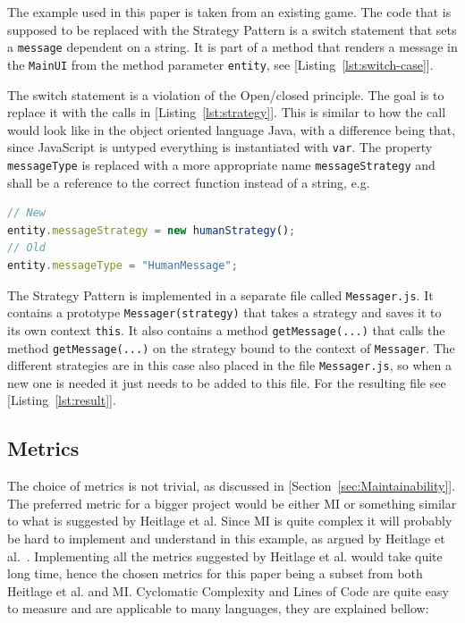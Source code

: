 \documentclass[conference, a4paper]{IEEEtran}
\begin{document}
The example used in this paper is taken from an existing game. The code that is supposed to be replaced with the Strategy Pattern is a switch statement that sets a \texttt{message} dependent on a string. It is part of a method that renders a message in the \texttt{MainUI} from the method parameter \texttt{entity}, see [Listing~\ref{lst:switch-case}].

The switch statement is a violation of the Open/closed principle. The goal is to replace it with the calls in [Listing~\ref{lst:strategy}]. This is similar to how the call would look like in the object oriented language Java, with a difference being that, since JavaScript is untyped everything is instantiated with \texttt{var}. The property \texttt{messageType} is replaced with a more appropriate name \texttt{messageStrategy} and shall be a reference to the correct function instead of a string, e.g.

\begin{lstlisting}[language=JavaScript]
// New
entity.messageStrategy = new humanStrategy();
// Old
entity.messageType = "HumanMessage";
\end{lstlisting}

The Strategy Pattern is implemented in a separate file called \texttt{Messager.js}. It contains a prototype \texttt{Messager(strategy)} that takes a strategy and saves it to its own context \texttt{this}. It also contains a method \texttt{getMessage(...)} that calls the method \texttt{getMessage(...)} on the strategy bound to the context of \texttt{Messager}. The different strategies are in this case also placed in the file \texttt{Messager.js}, so when a new one is needed it just needs to be added to this file. For the resulting file see [Listing~\ref{lst:result}].

\subsection{Metrics}
The choice of metrics is not trivial, as discussed in [Section~\ref{sec:Maintainability}]. The preferred metric for a bigger project would be either MI or something similar to what is suggested by Heitlage et al. Since MI is quite complex it will probably be hard to implement and understand in this example, as argued by Heitlage et al.~\cite{bibitem:Maintainability}. Implementing all the metrics suggested by Heitlage et al. would take quite long time, hence the chosen metrics for this paper being a subset from both Heitlage et al. and MI. Cyclomatic Complexity and Lines of Code are quite easy to measure and are applicable to many languages, they are explained bellow:
\end{document}
